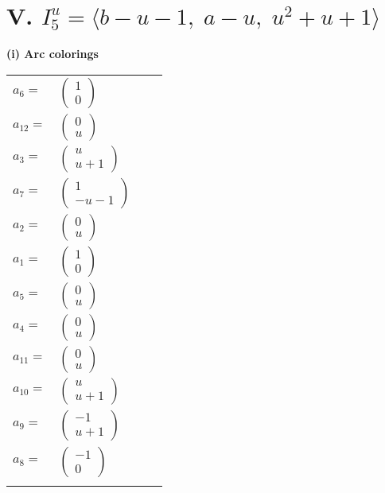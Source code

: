 \documentclass[1p]{elsarticle_modified}
\theoremstyle{definition}
\begin{document}
\centering \section*{V. $I^u_{5}= \langle b- u-1,\;a- u,\;u^2+u+1 \rangle$}
\flushleft \textbf{(i) Arc colorings}\\
\begin{tabular}{m{7pt} m{180pt} m{7pt} m{180pt} }
\flushright $a_{6}=$&$\begin{pmatrix}1\\0\end{pmatrix}$ \\
\flushright $a_{12}=$&$\begin{pmatrix}0\\u\end{pmatrix}$ \\
\flushright $a_{3}=$&$\begin{pmatrix}u\\u+1\end{pmatrix}$ \\
\flushright $a_{7}=$&$\begin{pmatrix}1\\- u-1\end{pmatrix}$ \\
\flushright $a_{2}=$&$\begin{pmatrix}0\\u\end{pmatrix}$ \\
\flushright $a_{1}=$&$\begin{pmatrix}1\\0\end{pmatrix}$ \\
\flushright $a_{5}=$&$\begin{pmatrix}0\\u\end{pmatrix}$ \\
\flushright $a_{4}=$&$\begin{pmatrix}0\\u\end{pmatrix}$ \\
\flushright $a_{11}=$&$\begin{pmatrix}0\\u\end{pmatrix}$ \\
\flushright $a_{10}=$&$\begin{pmatrix}u\\u+1\end{pmatrix}$ \\
\flushright $a_{9}=$&$\begin{pmatrix}-1\\u+1\end{pmatrix}$ \\
\flushright $a_{8}=$&$\begin{pmatrix}-1\\0\end{pmatrix}$\\&\end{tabular}
\end{document}
